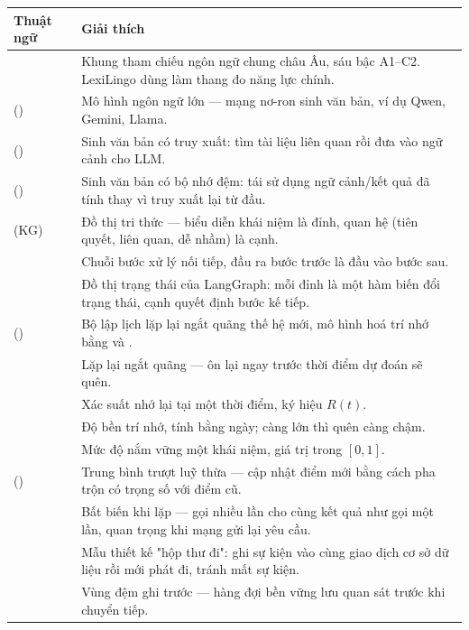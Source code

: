 \begin{longtable}{L{3.6cm} L{10.2cm}}
\toprule
\textbf{Thuật ngữ} & \textbf{Giải thích}\\
\midrule
\endhead
{} & Khung tham chiếu ngôn ngữ chung châu Âu, sáu bậc A1--C2. LexiLingo dùng làm thang đo năng lực chính.\\
 () & Mô hình ngôn ngữ lớn — mạng nơ-ron sinh văn bản, ví dụ Qwen, Gemini, Llama.\\
 () & Sinh văn bản có truy xuất: tìm tài liệu liên quan rồi đưa vào ngữ cảnh cho LLM.\\
 () & Sinh văn bản có bộ nhớ đệm: tái sử dụng ngữ cảnh/kết quả đã tính thay vì truy xuất lại từ đầu.\\
 (KG) & Đồ thị tri thức — biểu diễn khái niệm là đỉnh, quan hệ (tiên quyết, liên quan, dễ nhầm) là cạnh.\\
 & Chuỗi bước xử lý nối tiếp, đầu ra bước trước là đầu vào bước sau.\\
 & Đồ thị trạng thái của LangGraph: mỗi đỉnh là một hàm biến đổi trạng thái, cạnh quyết định bước kế tiếp.\\
 () & Bộ lập lịch lặp lại ngắt quãng thế hệ mới, mô hình hoá trí nhớ bằng  và .\\
 & Lặp lại ngắt quãng — ôn lại ngay trước thời điểm dự đoán sẽ quên.\\
 & Xác suất nhớ lại tại một thời điểm, ký hiệu \(R(t)\).\\
 & Độ bền trí nhớ, tính bằng ngày; càng lớn thì quên càng chậm.\\
 & Mức độ nắm vững một khái niệm, giá trị trong \([0,1]\).\\
 () & Trung bình trượt luỹ thừa — cập nhật điểm mới bằng cách pha trộn có trọng số với điểm cũ.\\
 & Bất biến khi lặp — gọi nhiều lần cho cùng kết quả như gọi một lần, quan trọng khi mạng gửi lại yêu cầu.\\
 & Mẫu thiết kế "hộp thư đi": ghi sự kiện vào cùng giao dịch cơ sở dữ liệu rồi mới phát đi, tránh mất sự kiện.\\
 & Vùng đệm ghi trước — hàng đợi bền vững lưu quan sát trước khi chuyển tiếp.\\

\end{longtable}
